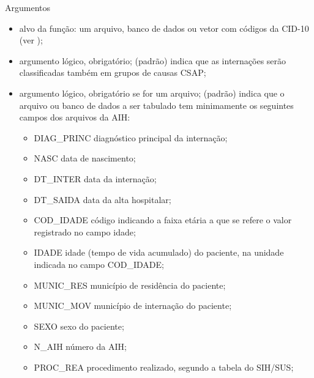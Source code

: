 \documentclass[letterpaper]{book}
\begin{document}
\begin{Section}{Argumentos}
\begin{itemize}
\item {}  alvo da função: um arquivo, banco de dados ou vetor com códigos da CID-10 (ver ); 
\item {}  argumento lógico, obrigatório;  (padrão) indica que as internações serão classificadas também em grupos de causas CSAP; 
\item {}  argumento lógico, obrigatório se  for um arquivo;  (padrão) indica que o arquivo ou banco de dados a ser tabulado tem minimamente os seguintes campos dos arquivos da AIH:
\begin{itemize}
\item DIAG\_PRINC diagnóstico principal da internação;
\item NASC data de nascimento; 
\item DT\_INTER 	data da internação; 
\item DT\_SAIDA 	data da alta hospitalar; 
\item COD\_IDADE 	código indicando a faixa etária a que se refere o valor registrado no campo idade; 
\item IDADE	idade (tempo de vida acumulado) do paciente, na unidade indicada no campo COD\_IDADE;
\item MUNIC\_RES	município de residência do paciente; 
\item MUNIC\_MOV município de internação do paciente; 
\item SEXO  sexo do paciente; 
\item N\_AIH	 número da AIH; 
\item  PROC\_REA	procedimento realizado, segundo a tabela do SIH/SUS; 

\end{itemize}
 

\end{itemize}
\end{Section}
\end{document}
